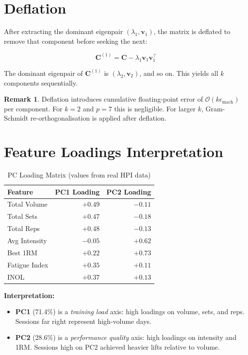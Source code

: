 \documentclass[12pt,a4paper]{report}
\newcommand{\mat}[1]{\mathbf{#1}}
\newcommand{\vect}[1]{\bm{#1}}
\theoremstyle{definition}
\newtheorem{remark}{Remark}[chapter]
\begin{document}
\section{Deflation}

After extracting the dominant eigenpair $(\lambda_1, \vect{v}_1)$, the matrix
is deflated to remove that component before seeking the next:

\[
  \mat{C}^{(1)} = \mat{C} - \lambda_1 \vect{v}_1 \vect{v}_1^\top
\]

The dominant eigenpair of $\mat{C}^{(1)}$ is $(\lambda_2, \vect{v}_2)$, and
so on. This yields all $k$ components sequentially.

\begin{remark}
Deflation introduces cumulative floating-point error of $\mathcal{O}(k\epsilon_{\text{mach}})$
per component. For $k = 2$ and $p = 7$ this is negligible. For larger $k$,
Gram-Schmidt re-orthogonalisation is applied after deflation.
\end{remark}

\section{Feature Loadings Interpretation}

\begin{table}[h!]
\centering
\caption{PC Loading Matrix (values from real HPI data)}
\begin{tabular}{lrr}
\toprule
\textbf{Feature} & \textbf{PC1 Loading} & \textbf{PC2 Loading} \\
\midrule
Total Volume     & $+0.49$ & $-0.11$ \\
Total Sets       & $+0.47$ & $-0.18$ \\
Total Reps       & $+0.48$ & $-0.13$ \\
Avg Intensity    & $-0.05$ &  $+0.62$ \\
Best 1RM         & $+0.22$ & $+0.73$ \\
Fatigue Index    & $+0.35$ & $+0.11$ \\
INOL             & $+0.37$ & $+0.13$ \\
\bottomrule
\end{tabular}
\end{table}

\noindent
\textbf{Interpretation:}
\begin{itemize}
  \item \textbf{PC1} (71.4\%) is a \emph{training load} axis: high loadings on
        volume, sets, and reps. Sessions far right represent high-volume days.
  \item \textbf{PC2} (28.6\%) is a \emph{performance quality} axis: high loadings
        on intensity and 1RM. Sessions high on PC2 achieved heavier lifts
        relative to volume.
\end{itemize}
\end{document}
